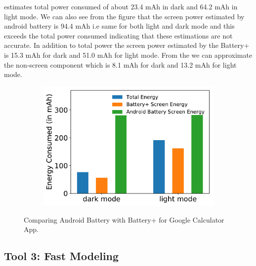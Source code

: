 estimates total power consumed of about 23.4 mAh in dark and 64.2
mAh in light mode.  We can also see from the figure that the screen
power estimated by android battery is 94.4 mAh i.e same for both
light and dark mode and this exceeds the total power consumed
indicating that these estimations are not accurate.  In addition to
total power the screen power estimated by the Battery+ is 15.3 mAh
for dark and 51.0 mAh for light mode.  From the we can approximate
the non-screen component which is 8.1 mAh for dark and 13.2 mAh for
light mode.  
\fi

\begin{figure}[h]
	\begin{subfigure}[]{\columnwidth}
		\centering
		\includegraphics[width=0.8\columnwidth]{./figure/513_battery_compare.pdf}
	\end{subfigure}
        \vspace{-0.1in}
	\caption{Comparing Android Battery with Battery+ for Google Calculator App.
}
	\label{fig:tool2_battery_compare}
\end{figure}
\fi
% 
% 

\subsection{Tool 3: Fast Modeling}

